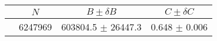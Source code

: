 \begin{tabular}{lccc}
\hline
    &   $N$   & $B \pm \delta B$  &  $C \pm \delta C$ \\
\hline
                               & 6247969    & 603804.5   $\pm$ 26447.3 & 0.648      $\pm$ 0.006 \\
\hline
\end{tabular}
